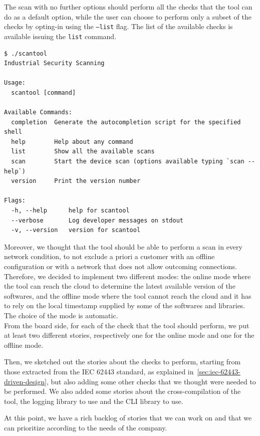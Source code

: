 The scan with no further options should perform all the checks that the tool can do as a default option, while the user can choose to perform only a subset of the checks by opting-in using the \texttt{--list} flag. The list of the available checks is available issuing the \texttt{list} command.

\begin{lstlisting}[caption={Man page}]
$ ./scantool
Industrial Security Scanning

Usage:
  scantool [command]

Available Commands:
  completion  Generate the autocompletion script for the specified shell
  help        Help about any command
  list        Show all the available scans
  scan        Start the device scan (options available typing `scan --help`)
  version     Print the version number

Flags:
  -h, --help      help for scantool
  --verbose       Log developer messages on stdout
  -v, --version   version for scantool
\end{lstlisting}

Moreover, we thought that the tool should be able to perform a scan in every network condition, to not exclude a priori a customer with an offline configuration or with a network that does not allow outcoming connections. Therefore, we decided to implement two different modes: the online mode where the tool can reach the cloud to determine the latest available version of the softwares, and the offline mode where the tool cannot reach the cloud and it has to rely on the local timestamp supplied by some of the softwares and libraries. The choice of the mode is automatic. \\
From the board side, for each of the check that the tool should perform, we put at least two different stories, respectively one for the online mode and one for the offline mode.

Then, we sketched out the stories about the checks to perform, starting from those extracted from the IEC 62443 standard, as explained in~\cref{sec:iec-62443-driven-design}, but also adding some other checks that we thought were needed to be performed. We also added some stories about the cross-compilation of the tool, the logging library to use and the CLI library to use.

At this point, we have a rich backlog of stories that we can work on and that we can prioritize according to the needs of the company.

